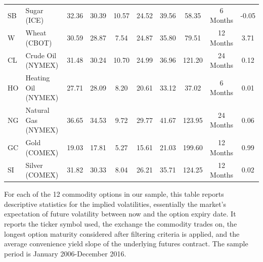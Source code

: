 \documentclass[12pt,a4paper]{article}
\providecommand{\tabularnewline}{\\}
\begin{document}
\begin{table}[!htbp]
\begin{tabular}{@{}llcccccccc@{}}
{\footnotesize{}SB} & {\footnotesize{}Sugar (ICE)} & {\footnotesize{}32.36} & {\footnotesize{}30.39} & {\footnotesize{}10.57} & {\footnotesize{}24.52} & {\footnotesize{}39.56} & {\footnotesize{}58.35}  & {\footnotesize{}6 Months} & {\footnotesize{}-0.05}\tabularnewline
{\footnotesize{}W} & {\footnotesize{}Wheat (CBOT)} & {\footnotesize{}30.59} & {\footnotesize{}28.87} & {\footnotesize{}7.54} & {\footnotesize{}24.87} & {\footnotesize{}35.80} & {\footnotesize{}79.51}  & {\footnotesize{}12 Months} & {\footnotesize{}3.71}\tabularnewline
{\footnotesize{}CL} & {\footnotesize{}Crude Oil (NYMEX)} & {\footnotesize{}31.48} & {\footnotesize{}30.24} & {\footnotesize{}10.70} & {\footnotesize{}24.99} & {\footnotesize{}36.96} & {\footnotesize{}121.20}  & {\footnotesize{}24 Months} & {\footnotesize{}0.12}\tabularnewline
{\footnotesize{}HO} & {\footnotesize{}Heating Oil (NYMEX)} & {\footnotesize{}27.71} & {\footnotesize{}28.09} & {\footnotesize{}8.20} & {\footnotesize{}20.61} & {\footnotesize{}33.12} & {\footnotesize{}37.02} & {\footnotesize{}6 Months} & {\footnotesize{}0.01}\tabularnewline
{\footnotesize{}NG} & {\footnotesize{}Natural Gas (NYMEX)} & {\footnotesize{}36.65} & {\footnotesize{}34.53} & {\footnotesize{}9.72} & {\footnotesize{}29.77} & {\footnotesize{}41.67} & {\footnotesize{}123.95}  & {\footnotesize{}24 Months} & {\footnotesize{}0.06}\tabularnewline
{\footnotesize{}GC} & {\footnotesize{}Gold (COMEX)} & {\footnotesize{}19.03} & {\footnotesize{}17.81} & {\footnotesize{}5.27} & {\footnotesize{}15.61} & {\footnotesize{}21.03} & {\footnotesize{}199.60}  & {\footnotesize{}12 Months} & {\footnotesize{}0.99}\tabularnewline
{\footnotesize{}SI} & {\footnotesize{}Silver (COMEX)} & {\footnotesize{}31.82} & {\footnotesize{}30.33} & {\footnotesize{}8.04} & {\footnotesize{}26.21} & {\footnotesize{}35.71} & {\footnotesize{}124.25}  & {\footnotesize{}12 Months} & {\footnotesize{}0.02}\tabularnewline
\bottomrule 
\end{tabular}
{\footnotesize For each of the 12 commodity options in our sample, this table reports descriptive statistics for the implied volatilities, essentially the market's expectation of future volatility between now and the option expiry date. It reports the ticker symbol used, the exchange the commodity trades on, the longest option maturity considered after filtering criteria is applied, and the average convenience yield slope of the underlying futures contract. The sample period is January 2006-December 2016.}
\end{table}
\end{document}
